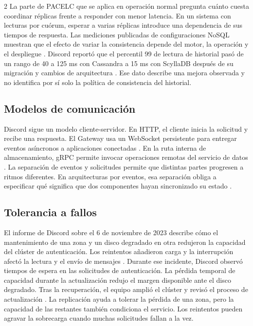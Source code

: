 \documentclass[11pt,a4paper]{article}
\begin{document}
\begin{multicols}{2}
La parte de PACELC que se aplica en operación normal pregunta cuánto
cuesta coordinar réplicas frente a responder con menor latencia. En un
sistema con lecturas por cuórum, esperar a varias réplicas introduce
una dependencia de sus tiempos de respuesta. Las mediciones publicadas
de configuraciones NoSQL muestran que el efecto de variar la
consistencia depende del motor, la operación y el despliegue
\cite{ferreira2024consistency}. Discord reportó que el percentil 99 de
lectura de historial pasó de un rango de 40 a 125 ms con Cassandra a 15 ms con
ScyllaDB después de su migración y cambios de arquitectura
\cite{ingram2023messages}. Ese dato describe una mejora observada y no
identifica por sí solo la política de consistencia del historial.

\subsection{Modelos de comunicación}
Discord sigue un modelo cliente-servidor. En HTTP, el cliente inicia la
solicitud y recibe una respuesta. El Gateway usa un WebSocket persistente
para entregar eventos asíncronos a aplicaciones conectadas
\cite{discordGateway}. En la ruta interna de almacenamiento, gRPC
permite invocar operaciones remotas del servicio de datos
\cite{ingram2023messages}. La separación de eventos y solicitudes
permite que distintas partes progresen a ritmos diferentes. En
arquitecturas por eventos, esa separación obliga a especificar qué
significa que dos componentes hayan sincronizado su estado
\cite{bacao2026consistency}.

\subsection{Tolerancia a fallos}
El informe de Discord sobre el 6 de noviembre de 2023 describe cómo el
mantenimiento de una zona y un disco degradado en otra redujeron la
capacidad del clúster de autenticación. Los reintentos añadieron carga y la
interrupción afectó la lectura y el envío de mensajes
\cite{smith2023authOutage}.
Durante ese incidente, Discord observó tiempos de espera en las
solicitudes de autenticación. La pérdida temporal de capacidad durante
la actualización redujo el margen disponible ante el disco degradado.
Tras la recuperación, el equipo amplió el clúster y revisó el proceso
de actualización \cite{smith2023authOutage}. La replicación ayuda a
tolerar la pérdida de una zona, pero la capacidad de las restantes
también condiciona el servicio. Los reintentos pueden agravar la
sobrecarga cuando muchas solicitudes fallan a la vez.

\end{multicols}
\end{document}
